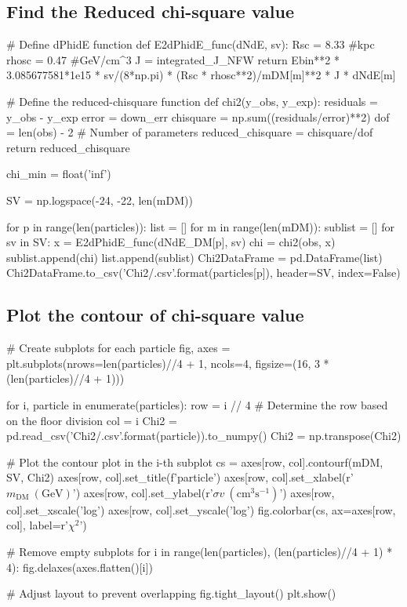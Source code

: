 \documentclass[10pt, oneside]{book}
\numberwithin{equation}{chapter}
\begin{document}
\subsection{Find the Reduced chi-square value}
\begin{python}
# Define dPhidE function
def E2dPhidE_func(dNdE, sv):
    Rsc = 8.33 #kpc
    rhosc = 0.47 #GeV/cm^3
    J = integrated_J_NFW
    return Ebin**2 * 3.085677581*1e15 * sv/(8*np.pi) * (Rsc * rhosc**2)/mDM[m]**2 * J * dNdE[m]


# Define the reduced-chisquare function
def chi2(y_obs, y_exp):
    residuals = y_obs - y_exp
    error = down_err
    chisquare = np.sum((residuals/error)**2)
    dof = len(obs) - 2 # Number of parameters
    reduced_chisquare = chisquare/dof
    return reduced_chisquare

chi_min = float('inf')

SV = np.logspace(-24, -22, len(mDM))

for p in range(len(particles)):
    list = []
    for m in range(len(mDM)):
        sublist = []
        for sv in SV:
            x = E2dPhidE_func(dNdE_DM[p], sv)
            chi = chi2(obs, x)
            sublist.append(chi)
        list.append(sublist)
    Chi2DataFrame = pd.DataFrame(list)
    Chi2DataFrame.to_csv('Chi2/{}.csv'.format(particles[p]), header=SV, index=False)
\end{python}

\subsection{Plot the contour of chi-square value}
\begin{python}
# Create subplots for each particle
fig, axes = plt.subplots(nrows=len(particles)//4 + 1, ncols=4, figsize=(16, 3 * (len(particles)//4 + 1)))

for i, particle in enumerate(particles):
    row = i // 4  # Determine the row based on the floor division
    col = i %
    Chi2 = pd.read_csv('Chi2/{}.csv'.format(particle)).to_numpy()
    Chi2 = np.transpose(Chi2)

    # Plot the contour plot in the i-th subplot
    cs = axes[row, col].contourf(mDM, SV, Chi2)
    axes[row, col].set_title(f'{particle}')
    axes[row, col].set_xlabel(r'$m_{\mathrm{DM}} \ (\mathrm{GeV})$')
    axes[row, col].set_ylabel(r'$\sigma v \ (\mathrm{cm^3 s^{-1}})$')
    axes[row, col].set_xscale('log')
    axes[row, col].set_yscale('log')
    fig.colorbar(cs, ax=axes[row, col], label=r'$\chi^2$')

# Remove empty subplots
for i in range(len(particles), (len(particles)//4 + 1) * 4):
    fig.delaxes(axes.flatten()[i])

# Adjust layout to prevent overlapping
fig.tight_layout()
plt.show()
\end{python}
\end{document}
